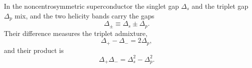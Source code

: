 \documentclass{article}
\begin{document}
In the noncentrosymmetric superconductor the singlet gap $\Delta_s$ and the triplet gap $\Delta_p$ mix, and the
two helicity bands carry the gaps
\begin{equation}
\Delta_\pm \equiv \Delta_s \pm \Delta_p .
\label{eq:gaps}
\end{equation}
Their difference measures the triplet admixture,
\begin{equation}
\Delta_+ - \Delta_- = 2\Delta_p ,
\label{eq:diff}
\end{equation}
and their product is
\begin{equation}
\Delta_+\Delta_- = \Delta_s^2 - \Delta_p^2 .
\label{eq:prod}
\end{equation}
\end{document}
